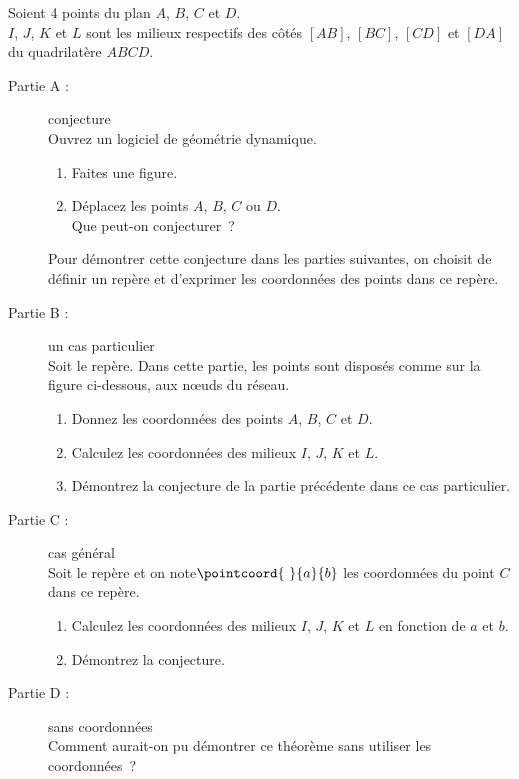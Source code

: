 \newpage
\exercice

Soient 4 points du plan $A$, $B$, $C$ et $D$.\\ $I$, $J$, $K$ et $L$ sont les milieux respectifs des côtés $[AB]$, $[BC]$, $[CD]$ et $[DA]$ du quadrilatère $ABCD$.\\

\begin{description}
	\item[Partie A :] conjecture\\
		Ouvrez un logiciel de géométrie dynamique.
		\begin{enumerate}
			\item Faites une figure.
			\item Déplacez les points $A$, $B$, $C$ ou $D$.\\ Que peut-on conjecturer~?
		\end{enumerate}
		Pour démontrer cette conjecture dans les parties suivantes, on choisit de définir un repère et d'exprimer les coordonnées des points dans ce repère.\\
		
	\item[Partie B :] un cas particulier\\
		Soit le repère. Dans cette partie, les points sont disposés comme sur la figure ci-dessous, aux n\oe{}uds du réseau.
		
		\begin{enumerate}
			\item Donnez les coordonnées des points $A$, $B$, $C$ et $D$.
			\item Calculez les coordonnées des milieux $I$, $J$, $K$ et $L$.
			\item Démontrez la conjecture de la partie précédente dans ce cas particulier.\\
		\end{enumerate}
		
	\item[Partie C :] cas général\\
		Soit le repère et on note$\pointcoord{~}{a}{b}$ les coordonnées du point $C$ dans ce repère.
		\begin{enumerate}
			\item Calculez les coordonnées des milieux $I$, $J$, $K$ et $L$ en fonction de $a$ et $b$.
			\item Démontrez la conjecture.\\
		\end{enumerate}
		
	\item[Partie D :] sans coordonnées\\
		Comment aurait-on pu démontrer ce théorème sans utiliser les coordonnées~?\\
\end{description}